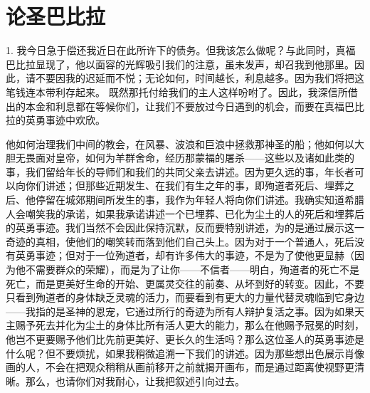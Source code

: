 
\chapter{论圣巴比拉}


1. 我今日急于偿还我近日在此所许下的债务。但我该怎么做呢？与此同时，真福巴比拉显现了，他以面容的光辉吸引我们的注意，虽未发声，却召我到他那里。因此，请不要因我的迟延而不悦；无论如何，时间越长，利息越多。因为我们将把这笔钱连本带利存起来。 既然那托付给我们的主人这样吩咐了。因此，我深信所借出的本金和利息都在等候你们，让我们不要放过今日遇到的机会，而要在真福巴比拉的英勇事迹中欢欣。\par

他如何治理我们中间的教会，在风暴、波浪和巨浪中拯救那神圣的船；他如何以大胆无畏面对皇帝，如何为羊群舍命，经历那蒙福的屠杀——这些以及诸如此类的事，我们留给年长的导师们和我们的共同父亲去讲述。因为更久远的事，年长者可以向你们讲述；但那些近期发生、在我们有生之年的事，即殉道者死后、埋葬之后、他停留在城郊期间所发生的事，我作为年轻人将向你们讲述。我确实知道希腊人会嘲笑我的承诺，如果我承诺讲述一个已埋葬、已化为尘土的人的死后和埋葬后的英勇事迹。我们当然不会因此保持沉默，反而要特别讲述，为的是通过展示这一奇迹的真相，使他们的嘲笑转而落到他们自己头上。因为对于一个普通人，死后没有英勇事迹；但对于一位殉道者，却有许多伟大的事迹，不是为了使他更显赫（因为他不需要群众的荣耀），而是为了让你——不信者——明白，殉道者的死亡不是死亡，而是更美好生命的开始、更属灵交往的前奏、从坏到好的转变。因此，不要只看到殉道者的身体缺乏灵魂的活力，而要看到有更大的力量代替灵魂临到它身边——我指的是圣神的恩宠，它通过所行的奇迹为所有人辩护复活之事。因为如果天主赐予死去并化为尘土的身体比所有活人更大的能力，那么在他赐予冠冕的时刻，他岂不更要赐予他们比先前更美好、更长久的生活吗？那么这位圣人的英勇事迹是什么呢？但不要烦扰，如果我稍微追溯一下我们的讲述。因为那些想出色展示肖像画的人，不会在把观众稍稍从画前移开之前就揭开画布，而是通过距离使视野更清晰。那么，也请你们对我耐心，让我把叙述引向过去。\par

